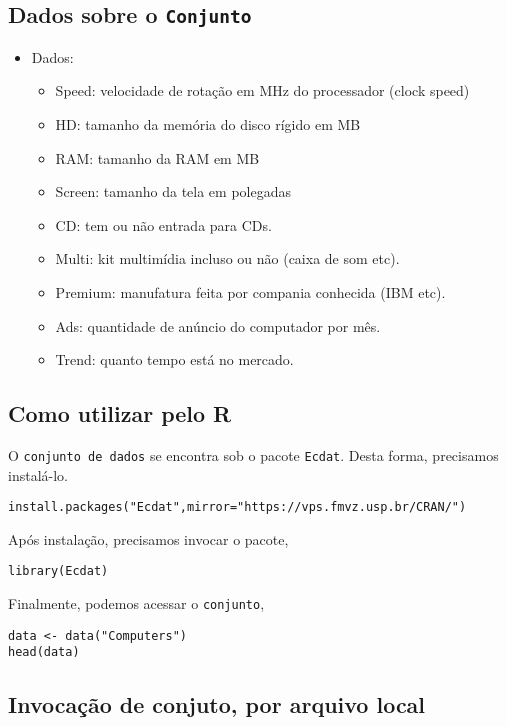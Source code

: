 \documentclass[12pt]{abntex2}
\begin{document}
\subsection{Dados sobre o \texttt{Conjunto}}
\label{sec:org5b0fc5a}
\begin{itemize}
\item Dados:
\begin{itemize}
\item Speed: velocidade de rotação em MHz do processador (clock speed)
\item HD: tamanho da memória do disco rígido em MB
\item RAM: tamanho da RAM em MB
\item Screen: tamanho da tela em polegadas
\item CD: tem ou não entrada para CDs.
\item Multi: kit multimídia incluso ou não (caixa de som etc).
\item Premium: manufatura feita por compania conhecida (IBM etc).
\item Ads: quantidade de anúncio do computador por mês.
\item Trend: quanto tempo está no mercado.
\end{itemize}
\end{itemize}
\subsection{Como utilizar pelo R}
\label{sec:orgbd1fec3}
O \texttt{conjunto de dados} se encontra sob o pacote \texttt{Ecdat}. Desta forma, precisamos
instalá-lo.

\begin{verbatim}
install.packages("Ecdat",mirror="https://vps.fmvz.usp.br/CRAN/")
\end{verbatim}

Após instalação, precisamos invocar o pacote,
\begin{verbatim}
library(Ecdat)
\end{verbatim}

Finalmente, podemos acessar o \texttt{conjunto},
\begin{verbatim}
data <- data("Computers")
head(data)
\end{verbatim}

\subsection{Invocação de conjuto, por arquivo local}
\label{sec:orgffce1ec}
\end{document}
